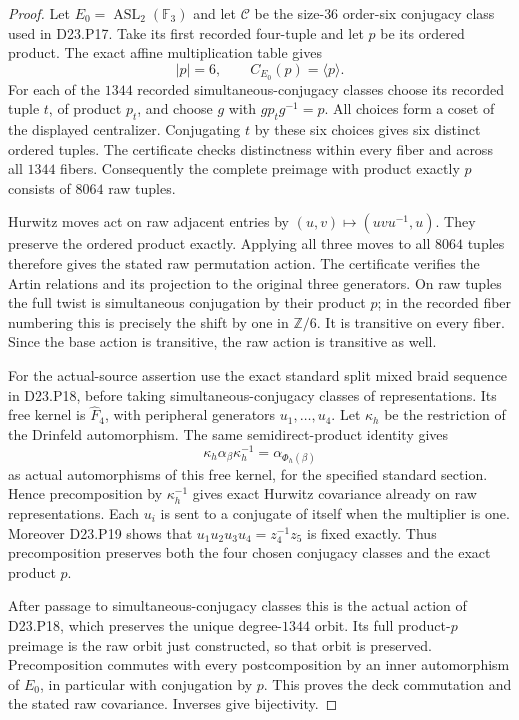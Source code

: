\begin{proof}
Let $E_0=\operatorname{ASL}_2(\mathbb F_3)$ and let
$\mathcal C$ be the size-$36$ order-six conjugacy class
used in D23.P17. Take its first recorded four-tuple and
let $p$ be its ordered product. The exact affine
multiplication table gives
\[
             |p|=6,\qquad C_{E_0}(p)=\langle p\rangle.
\]
For each of the $1344$ recorded simultaneous-conjugacy
classes choose its recorded tuple $t$, of product $p_t$,
and choose $g$ with $gp_tg^{-1}=p$. All choices form a
coset of the displayed centralizer. Conjugating $t$ by
these six choices gives six distinct ordered tuples.
The certificate checks distinctness within every fiber
and across all $1344$ fibers. Consequently the complete
preimage with product exactly $p$ consists of $8064$
raw tuples.

Hurwitz moves act on raw adjacent entries by
$(u,v)\mapsto(uvu^{-1},u)$. They preserve the ordered
product exactly. Applying all three moves to all $8064$
tuples therefore gives the stated raw permutation action.
The certificate verifies the Artin relations and its
projection to the original three generators. On raw
tuples the full twist is simultaneous conjugation by
their product $p$; in the recorded fiber numbering this
is precisely the shift by one in $\mathbb Z/6$. It is
transitive on every fiber. Since the base action is
transitive, the raw action is transitive as well.

For the actual-source assertion use the exact standard
split mixed braid sequence in D23.P18, before taking
simultaneous-conjugacy classes of representations.
Its free kernel is $\widehat F_4$, with peripheral
generators $u_1,\ldots,u_4$. Let $\kappa_h$ be the
restriction of the Drinfeld automorphism. The same
semidirect-product identity gives
\[
       \kappa_h\alpha_\beta\kappa_h^{-1}
                        =\alpha_{\Phi_h(\beta)}
\]
as actual automorphisms of this free kernel, for the
specified standard section. Hence precomposition by
$\kappa_h^{-1}$ gives exact Hurwitz covariance already
on raw representations. Each $u_i$ is sent to a conjugate
of itself when the multiplier is one. Moreover D23.P19
shows that $u_1u_2u_3u_4=z_4^{-1}z_5$ is fixed exactly.
Thus precomposition preserves both the four chosen
conjugacy classes and the exact product $p$.

After passage to simultaneous-conjugacy classes this is
the actual action of D23.P18, which preserves the unique
degree-$1344$ orbit. Its full product-$p$ preimage is the
raw orbit just constructed, so that orbit is preserved.
Precomposition commutes with every postcomposition by
an inner automorphism of $E_0$, in particular with
conjugation by $p$. This proves the deck commutation
and the stated raw covariance. Inverses give bijectivity.
\end{proof}


